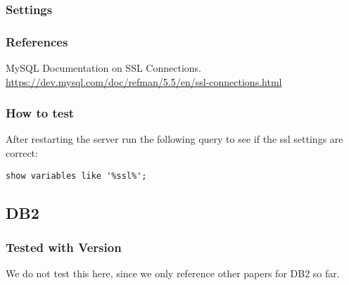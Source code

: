 \subsubsection{Settings}






\subsubsection{References}
\begin{itemize*}
  \item MySQL Documentation on SSL Connections.\\\url{https://dev.mysql.com/doc/refman/5.5/en/ssl-connections.html}
\end{itemize*}


\subsubsection{How to test}
After restarting the server run the following query to see if the ssl settings are correct:
\begin{lstlisting}
show variables like '%ssl%';
\end{lstlisting}


\subsection{DB2}
\subsubsection{Tested with Version}
\begin{itemize*}
\item  We do not test this here, since we only reference other papers for DB2 so far.
\end{itemize*}


